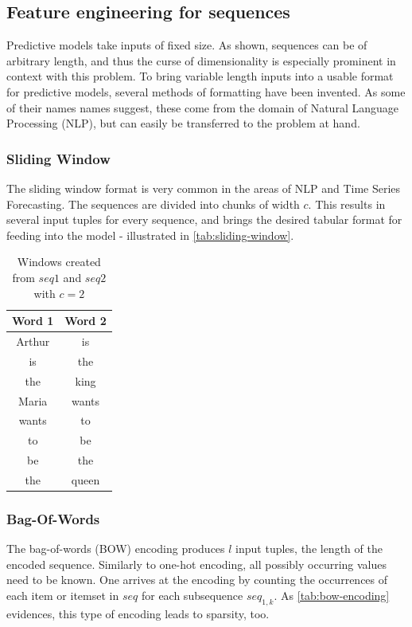 \subsection{Feature engineering for sequences}
\label{sec:sequential-feature-engineering}
Predictive models take inputs of fixed size. As shown, sequences can be of arbitrary length, and thus the curse of dimensionality is especially prominent in context with this problem. To bring variable length inputs into a usable format for predictive models, several methods of formatting have been invented. As some of their names names suggest, these come from the domain of Natural Language Processing (NLP), but can easily be transferred to the problem at hand.

\subsubsection*{Sliding Window}
The sliding window format is very common in the areas of NLP and Time Series Forecasting. The sequences are divided into chunks of width $c$. This results in several input tuples for every sequence, and brings the desired tabular format for feeding into the model - illustrated in \autoref{tab:sliding-window}.

\begin{table}[ht]
    \centering
    \begin{tabular}{cc}
        Word 1 & Word 2\\
        \hline
        Arthur & is\\
        is & the\\
        the & king\\
        Maria & wants\\
        wants & to\\
        to & be\\
        be & the\\
        the & queen
    \end{tabular}
    \caption{Windows created from $seq1$ and $seq2$ with $c=2$}
    \label{tab:sliding-window}
\end{table}

\subsubsection*{Bag-Of-Words}
The bag-of-words (BOW) encoding produces $l$ input tuples, the length of the encoded sequence. Similarly to one-hot encoding, all possibly occurring values need to be known. One arrives at the encoding by counting the occurrences of each item or itemset in $seq$ for each subsequence $seq_{1,k}$. As \autoref{tab:bow-encoding} evidences, this type of encoding leads to sparsity, too.

